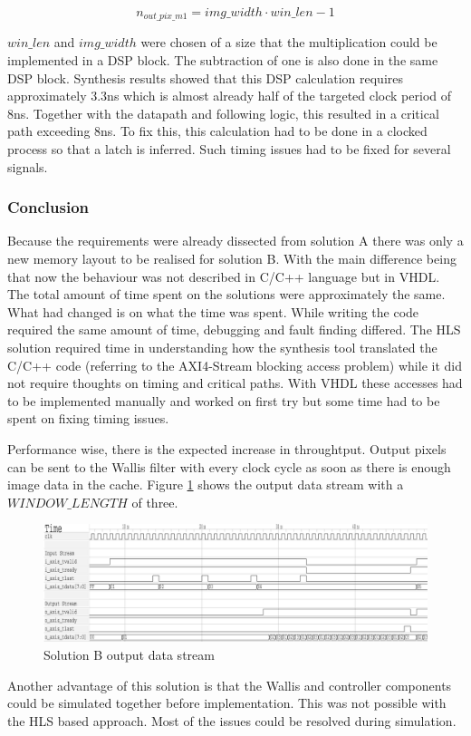 \begin{equation}
    n_{out\_pix\_m1} = img\_width \cdot win\_len - 1
    \label{eq:noutpix}
\end{equation}

$win\_len$ and $img\_width$ were chosen of a size that the multiplication could
be implemented in a DSP block. The subtraction of one is also done in the same
DSP block. Synthesis results showed that this DSP calculation requires
approximately 3.3ns
which is almost already half of the targeted clock period of 8ns. Together with
the datapath and following logic, this resulted in a critical path exceeding
8ns. To fix this,
this calculation had to be done in a clocked process so that a latch is
inferred. Such timing issues had to be fixed for several signals.

% 
\subsubsection*{Conclusion}
Because the requirements were already dissected from solution A there was only a
new memory layout to be realised for solution B. With the main difference being
that now the behaviour was not described in C/C++ language but in VHDL. The
total
amount of time spent on the solutions were approximately the same. What had
changed is on what the time was spent. While writing the code required the same
amount of time, debugging and fault finding differed. The HLS solution required
time in understanding how the synthesis tool translated the C/C++ code (referring
to the AXI4-Stream blocking access problem) while it did not require thoughts on
timing
and critical paths. With VHDL these accesses had to be implemented manually and
worked on first try but some time had to be spent on fixing timing issues.

Performance wise, there is the expected increase in throughtput. Output pixels
can be sent to the Wallis filter with every clock cycle as soon as there is
enough image data in the cache. Figure \ref{fig:tracesolb} shows the output data
stream with a $WINDOW\_LENGTH$ of three. 

\begin{figure}[tb!]
    \centering
    \includegraphics[width=\textwidth]{images/controller/vhdlcontrollerout.png}
    \caption{Solution B output data stream}
    \label{fig:tracesolb}
\end{figure}

Another advantage of this solution is that the Wallis and controller components
could be simulated together before implementation. This was not possible with
the HLS based approach. Most of the issues could be resolved during simulation.



